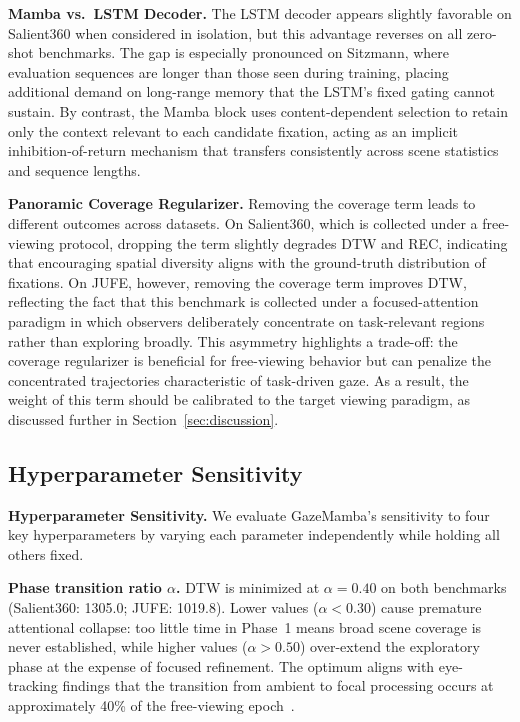 \documentclass[sigconf]{acmart}
\begin{document}
\textbf{Mamba vs.\ LSTM Decoder.}
The LSTM decoder appears slightly favorable on Salient360 when considered in isolation, but this advantage reverses on all zero-shot benchmarks.
The gap is especially pronounced on Sitzmann, where evaluation sequences are longer than those seen during training, placing additional demand on long-range memory that the LSTM's fixed gating cannot sustain.
By contrast, the Mamba block uses content-dependent selection to retain only the context relevant to each candidate fixation, acting as an implicit inhibition-of-return mechanism that transfers consistently across scene statistics and sequence lengths.

\textbf{Panoramic Coverage Regularizer.}
Removing the coverage term leads to different outcomes across datasets.
On Salient360, which is collected under a free-viewing protocol, dropping the term slightly degrades DTW and REC, indicating that encouraging spatial diversity aligns with the ground-truth distribution of fixations.
On JUFE, however, removing the coverage term improves DTW, reflecting the fact that this benchmark is collected under a focused-attention paradigm in which observers deliberately concentrate on task-relevant regions rather than exploring broadly.
This asymmetry highlights a trade-off: the coverage regularizer is beneficial for free-viewing behavior but can penalize the concentrated trajectories characteristic of task-driven gaze.
As a result, the weight of this term should be calibrated to the target viewing paradigm, as discussed further in Section~\ref{sec:discussion}.

\subsection{Hyperparameter Sensitivity}
\label{sec:hyperparam}

\noindent\textbf{Hyperparameter Sensitivity.}
We evaluate GazeMamba's sensitivity to four key hyperparameters by varying each parameter independently while holding all others fixed.

\textbf{Phase transition ratio $\alpha$.}
DTW is minimized at $\alpha{=}0.40$ on both benchmarks
(Salient360: 1305.0; JUFE: 1019.8).
Lower values ($\alpha < 0.30$) cause premature attentional collapse: too
little time in Phase~1 means broad scene coverage is never established, while
higher values ($\alpha > 0.50$) over-extend the exploratory phase at the
expense of focused refinement.
The optimum aligns with eye-tracking findings that the transition from ambient
to focal processing occurs at approximately 40\% of the free-viewing
epoch~\cite{unema2005time}.
\end{document}
